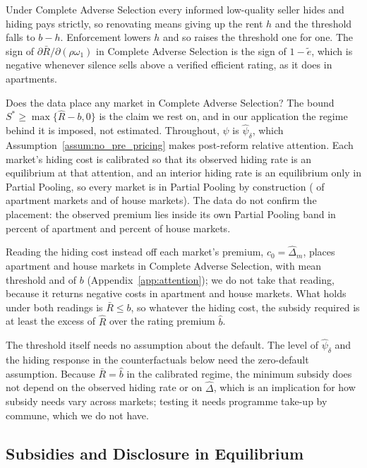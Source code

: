 \documentclass[10pt,letterpaper]{bp-template-concise}
\begin{document}
Under Complete Adverse Selection every informed low-quality seller hides and hiding pays strictly, so renovating means giving up the rent $h$ and the threshold falls to $b-h$. Enforcement lowers $h$ and so raises the threshold one for one. The sign of $\partial\bar R/\partial(\rho\omega_1)$ in Complete Adverse Selection is the sign of $1-\tilde e$, which is negative whenever silence sells above a verified efficient rating, as it does in apartments.

Does the data place any market in Complete Adverse Selection? The bound $S^*\ge\max\{\hat R-b,0\}$ is the claim we rest on, and in our application the regime behind it is imposed, not estimated. Throughout, $\psi$ is $\hat\psi_\delta$, which Assumption~\ref{assum:no_pre_pricing} makes post-reform relative attention. Each market's hiding cost is calibrated so that its observed hiding rate is an equilibrium at that attention, and an interior hiding rate is an equilibrium only in Partial Pooling, so every market is in Partial Pooling by construction (\attScBaseNPpApt{} of \attNMarketsApt{} apartment markets and \attScBaseNPpHouse{} of \attNMarketsHouse{} house markets). The data do not confirm the placement: the observed premium lies inside its own Partial Pooling band in \attShareInBandApt{} percent of apartment and \attShareInBandHouse{} percent of house markets.

Reading the hiding cost instead off each market's premium, $c_0=\hat\Delta_m$, places \attRawNCasApt{} apartment and \attRawNCasHouse{} house markets in Complete Adverse Selection, with mean threshold \attRawRbarRatioApt{} and \attRawRbarRatioHouse{} of $b$ (Appendix~\ref{app:attention}); we do not take that reading, because it returns negative costs in \attRawNNegApt{} apartment and \attRawNNegHouse{} house markets. What holds under both readings is $\bar R\le b$, so whatever the hiding cost, the subsidy required is at least the excess of $\hat R$ over the rating premium $\hat b$.

The threshold itself needs no assumption about the default. The level of $\hat\psi_\delta$ and the hiding response in the counterfactuals below need the zero-default assumption. Because $\bar R=\hat b$ in the calibrated regime, the minimum subsidy does not depend on the observed hiding rate or on $\hat\Delta$, which is an implication for how subsidy needs vary across markets; testing it needs programme take-up by commune, which we do not have.

\subsection{Subsidies and Disclosure in Equilibrium}
\label{ss:policy_ge}
\end{document}
